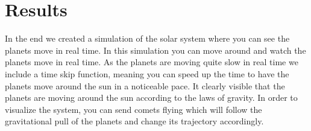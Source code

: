 \section{Results}
In the end we created a simulation of the solar system where you can see the planets move in real time. 
In this simulation you can move around and watch the planets move in real time. As the planets are moving quite slow in real time we include a time skip function, meaning you can speed up the time to have the planets move around the sun in a noticeable pace. 
It clearly visible that the planets are moving around the sun according to the laws of gravity.
In order to visualize the system, you can send comets flying which will follow the gravitational pull of the planets and change its trajectory accordingly. 